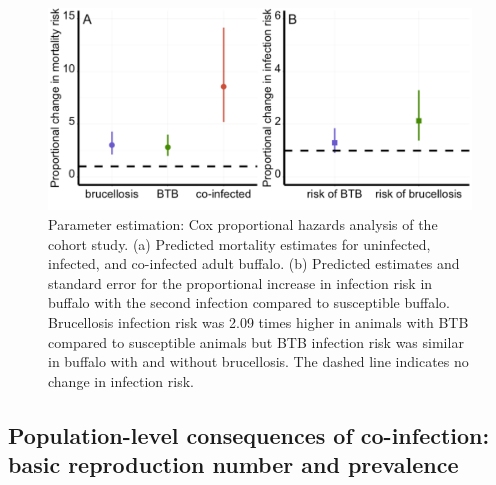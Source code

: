 \documentclass[10pt,letterpaper]{article}
\begin{document}
\begin{figure}[ht]
\centering
\includegraphics[width=.9\linewidth]{Figure2.pdf}
\caption{Parameter estimation: Cox proportional hazards analysis of the cohort study. (a) Predicted mortality estimates for uninfected, infected, and co-infected adult buffalo. (b) Predicted estimates and standard error for the proportional increase in infection risk in buffalo with the second infection compared to susceptible buffalo. Brucellosis infection risk was 2.09 times higher in animals with BTB compared to susceptible animals but BTB infection risk was similar in buffalo with and without brucellosis. The dashed line indicates no change in infection risk.}
\label{fig:fig2}
\end{figure}

\subsection*{Population-level consequences of co-infection: basic reproduction number and prevalence}
\end{document}
